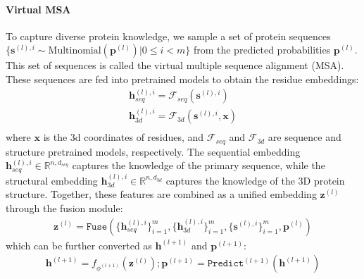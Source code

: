 \documentclass{article}
\begin{document}
\paragraph{Virtual MSA} To capture diverse protein knowledge, we sample a set of protein sequences $\{\boldsymbol{s}^{(l), i} \sim \text{Multinomial}(\boldsymbol{p}^{(l)})| 0 \leq i<m\}$ from the predicted probabilities $\boldsymbol{p}^{(l)}$. This set of sequences is called the virtual multiple sequence alignment (MSA). These sequences are fed into pretrained models to obtain the residue embeddings:
 \begin{align}
     \boldsymbol{h}^{(l),i}_{seq} = \mathcal{F}_{seq}(\boldsymbol{s}^{(l), i})\\
     \boldsymbol{h}^{(l),i}_{3d} = \mathcal{F}_{3d}(\boldsymbol{s}^{(l), i}, \boldsymbol{x})\\
 \end{align}
 where $\boldsymbol{x}$ is the 3d coordinates of residues, and $\mathcal{F}_{seq}$ and $\mathcal{F}_{3d}$ are sequence and structure pretrained models, respectively. The sequential embedding $\boldsymbol{h}^{(l),i}_{seq} \in \mathbb{R}^{n, d_{seq}}$ captures the knowledge of the primary sequence, while the structural embedding $\boldsymbol{h}^{(l),i}_{3d} \in \mathbb{R}^{n, d_{3d}}$ captures the knowledge of the 3D protein structure. Together, these features are combined as a unified embedding $\boldsymbol{z}^{(l)}$ through the fusion module:
 \begin{align}
    \boldsymbol{z}^{(l)} = \texttt{Fuse}(\{\boldsymbol{h}^{(l),i}_{seq}\}_{i=1}^m, \{\boldsymbol{h}^{(l),i}_{3d}\}_{i=1}^m, \{\boldsymbol{s}^{(l),i}\}_{i=1}^m, \boldsymbol{p}^{(l)})
\end{align}
which can be further converted as $\boldsymbol{h}^{(l+1)}$ and $\boldsymbol{p}^{(l+1)}$:
\begin{align}
    \boldsymbol{h}^{(l+1)} = f_{\phi^{(l+1)}}(\boldsymbol{z}^{(l)}); \boldsymbol{p}^{(l+1)} = \texttt{Predict}^{(l+1)}(\boldsymbol{h}^{(l+1)})
\end{align}
\end{document}
